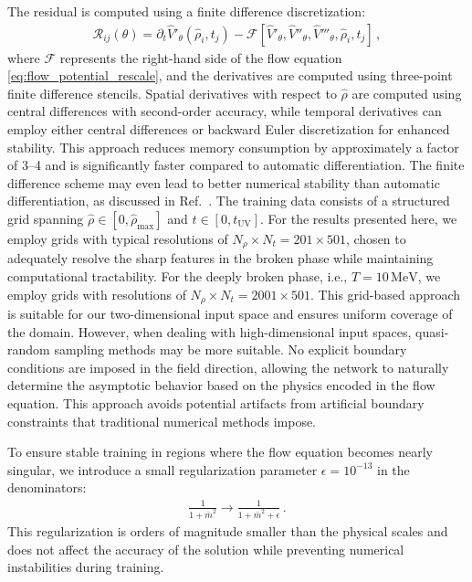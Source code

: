 \documentclass[reprint,twocolumn,superscriptaddress,preprintnumbers,amsmath,amssymb,aps,prd,floatfix]{revtex4-2}
\begin{document}
The residual is computed using a finite difference discretization:
\begin{align}
	\mathcal{R}_{ij}(\theta) = \partial_t \hat{V}'_{\theta}(\hat{\rho}_i, t_j) - \mathcal{F}\left[\hat{V}'_{\theta}, \hat{V}''_{\theta},\hat{V}'''_{\theta}, \hat{\rho}_i, t_j\right]\,,
\end{align}
where $\mathcal{F}$ represents the right-hand side of the flow equation \eqref{eq:flow_potential_rescale}, and the derivatives are computed using three-point finite difference stencils. Spatial derivatives with respect to $\hat{\rho}$ are computed using central differences with second-order accuracy, while temporal derivatives can employ either central differences or backward Euler discretization for enhanced stability. This approach reduces memory consumption by approximately a factor of 3--4 and is significantly faster compared to automatic differentiation. The finite difference scheme may even lead to better numerical stability than automatic differentiation, as discussed in Ref.~\cite{Chiu_2022}. The training data consists of a structured grid spanning $\hat{\rho} \in [0, \hat{\rho}_{\max}]$ and $t \in [0, t_{\mathrm{UV}}]$. For the results presented here, we employ grids with typical resolutions of $N_{\rho} \times N_t = 201 \times 501$, chosen to adequately resolve the sharp features in the broken phase while maintaining computational tractability. For the deeply broken phase, i.e., $T=10\,\mathrm{MeV}$, we employ grids with resolutions of $N_{\rho} \times N_t = 2001 \times 501$. This grid-based approach is suitable for our two-dimensional input space and ensures uniform coverage of the domain. However, when dealing with high-dimensional input spaces, quasi-random sampling methods may be more suitable. No explicit boundary conditions are imposed in the field direction, allowing the network to naturally determine the asymptotic behavior based on the physics encoded in the flow equation. This approach avoids potential artifacts from artificial boundary constraints that traditional numerical methods impose.


To ensure stable training in regions where the flow equation becomes nearly singular, we introduce a small regularization parameter $\epsilon = 10^{-13}$ in the denominators:
\begin{align}
	\frac{1}{1 + \bar{m}^2} \to \frac{1}{1 + \bar{m}^2 + \epsilon}\,.
\end{align}
This regularization is orders of magnitude smaller than the physical scales and does not affect the accuracy of the solution while preventing numerical instabilities during training.
\end{document}
